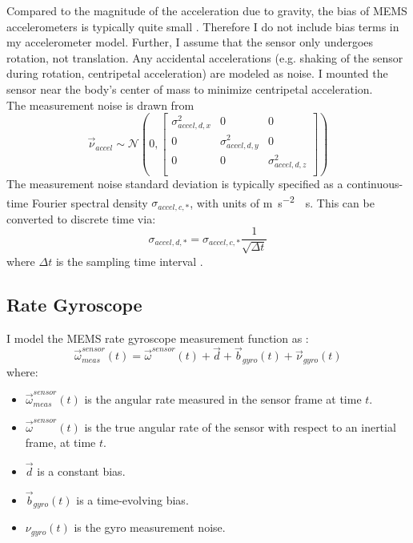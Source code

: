 \documentclass[conference]{IEEEtran}
\begin{document}
Compared to the magnitude of the acceleration due to gravity, the bias of MEMS accelerometers is typically quite small \cite{mpu9150, UCAM-CL-TR-696}. Therefore I do not include bias terms in my accelerometer model. Further, I assume that the sensor only undergoes rotation, not translation. Any accidental accelerations (e.g. shaking of the sensor during rotation, centripetal acceleration) are modeled as noise. I mounted the sensor near the body's center of mass to minimize centripetal acceleration.\\

The measurement noise is drawn from
\begin{equation}
  \vec{\nu}_{accel} \sim \mathcal{N}(0,
  \begin{bmatrix}
    \sigma_{accel,d,x}^2 & 0 & 0 \\
     0 & \sigma_{accel,d,y}^2 & 0 \\
     0 & 0 & \sigma_{accel,d,z}^2 \\
    \end{bmatrix}
  )
\end{equation}
The measurement noise standard deviation is typically specified as a continuous-time Fourier spectral density $\sigma_{accel,c,*}$, with units of \si{\meter\second^{-2}\sqrt\second}. This can be converted to discrete time via:
\begin{equation}
  \label{eqn:cont_to_desc_noise}
  \sigma_{accel,d,*} = \sigma_{accel,c,*} \frac{1}{\sqrt{\Delta t}}
\end{equation}
where $\Delta t$ is the sampling time interval \cite{1642588}.


\subsection{Rate Gyroscope}
I model the MEMS rate gyroscope measurement function as \cite{1642588}:
\begin{equation}
  \vec{\omega}_{meas}^{sensor}(t) = \vec{\omega}^{sensor}(t) + \vec{d} + \vec{b}_{gyro}(t) + \vec{\nu}_{gyro}(t)
\end{equation}
where:
\begin{itemize}
  \item $\vec{\omega}_{meas}^{sensor}(t)$ is the angular rate measured in the sensor frame at time $t$.
  \item $\vec{\omega}^{sensor}(t)$ is the true angular rate of the sensor with respect to an inertial frame, at time $t$.
  \item $\vec{d}$ is a constant bias.
  \item $\vec{b}_{gyro}(t)$ is a time-evolving bias.
  \item $\nu_{gyro}(t)$ is the gyro measurement noise.
\end{itemize}
\end{document}
